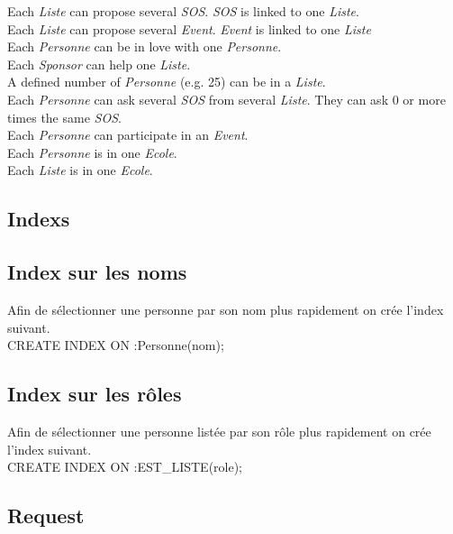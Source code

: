 \documentclass[a4paper,oneside,1pt]{article}
\begin{document}
Each \textit{Liste} can propose several \textit{SOS}. \textit{SOS} is linked to one \textit{Liste}. \\
Each \textit{Liste} can propose several \textit{Event}. \textit{Event} is linked to one \textit{Liste} \\
Each \textit{Personne} can be in love with one \textit{Personne}. \\
Each \textit{Sponsor} can help one \textit{Liste}. \\
A defined number of \textit{Personne} (e.g. 25) can be in a \textit{Liste}. \\
Each \textit{Personne} can ask several \textit{SOS} from several \textit{Liste}. They can ask 0 or more times the same \textit{SOS}. \\
Each \textit{Personne} can participate in an \textit{Event}. \\
Each \textit{Personne} is in one \textit{Ecole}. \\
Each \textit{Liste} is in one \textit{Ecole}. \\
\subsection{Indexs}
\subsection{Index sur les noms}
Afin de sélectionner une personne par son nom plus rapidement on crée l'index suivant.
\\
CREATE INDEX ON :Personne(nom);
\subsection{Index sur les rôles}
Afin de sélectionner une personne listée par son rôle plus rapidement on crée l'index suivant.
\\
CREATE INDEX ON :EST_LISTE(role);
\subsection{Request}

\end{document}

